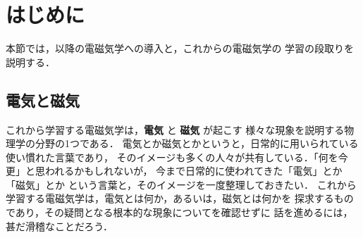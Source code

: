 ﻿%

    \section{はじめに}\label{sec:EM_ObjPreMsg}
        \begin{mycomment}
            本節では，以降の電磁気学への導入と，これからの電磁気学の
            学習の段取りを説明する．
        \end{mycomment}

    \subsection{電気と磁気}\label{subsec:ElcAndMgn}
        これから学習する電磁気学は，\textbf{電気} と \textbf{磁気} が起こす
        様々な現象を説明する物理学の分野の1つである．
        電気とか磁気とかというと，日常的に用いられている使い慣れた言葉であり，
        そのイメージも多くの人々が共有している．「何を今更」と思われるかもしれないが，
        今まで日常的に使われてきた「電気」とか「磁気」とか
        という言葉と，そのイメージを一度整理しておきたい．
        これから学習する電磁気学は，電気とは何か，あるいは，磁気とは何かを
        探求するものであり，その疑問となる根本的な現象についてを確認せずに
        話を進めるには，甚だ滑稽なことだろう．

